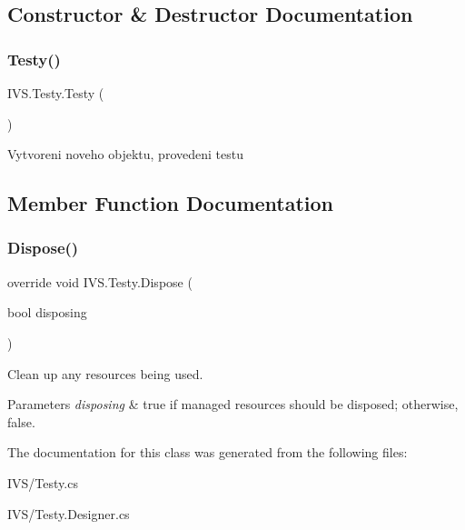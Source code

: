 \subsection{Constructor \& Destructor Documentation}
\mbox{\label{class_i_v_s_1_1_testy_aa23cf506d76f5bc99002eeae9fd2f91c}} 
\subsubsection{\texorpdfstring{Testy()}{Testy()}}
{\footnotesize\ttfamily I\+V\+S.\+Testy.\+Testy (\begin{DoxyParamCaption}{ }\end{DoxyParamCaption})}



Vytvoreni noveho objektu, provedeni testu 



\subsection{Member Function Documentation}
\mbox{\label{class_i_v_s_1_1_testy_a231cc8b0d786365ab6a36d8e7ef902aa}} 
\subsubsection{\texorpdfstring{Dispose()}{Dispose()}}
{\footnotesize\ttfamily override void I\+V\+S.\+Testy.\+Dispose (\begin{DoxyParamCaption}\item[{bool}]{disposing }\end{DoxyParamCaption})\hspace{0.3cm}{\ttfamily [protected]}}



Clean up any resources being used. 


\begin{DoxyParams}{Parameters}
{\em disposing} & true if managed resources should be disposed; otherwise, false.\\
\hline
\end{DoxyParams}


The documentation for this class was generated from the following files\+:\begin{DoxyCompactItemize}
\item 
I\+V\+S/Testy.\+cs\item 
I\+V\+S/Testy.\+Designer.\+cs\end{DoxyCompactItemize}

